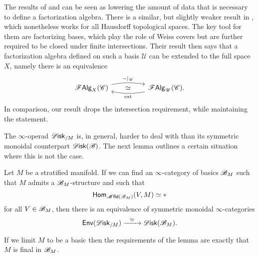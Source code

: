 \documentclass[../text.tex]{subfiles}
\begin{document}
\begin{remark}
    The results of  and  can be seen as lowering the amount of data that is necessary to define a factorization algebra. There is a similar, but slightly weaker result in \cite[\S7.2]{cg2016}, which nonetheless works for all Hausdorff topological spaces. The key tool for them are factorizing bases, which play the role of Weiss covers but are further required to be closed under finite intersections. Their result then says that a factorization algebra defined on such a basis $\mathscr{U}$ can be extended to the full space $X$, namely there is an equivalence
    \begin{equation}
        \begin{tikzcd}
            \falg_X(\catC) \arrow[rr, bend left=10, "\mathrm{-|_{\mathscr{U}}}"] \arrow[rr, phantom, "\simeq"]&  & \falg_{\mathscr{U}}(\catC) \arrow[ll, bend left=10, "\mathrm{ext}"].
        \end{tikzcd}
    \end{equation}
    In comparison, our result drops the intersection requirement, while maintaining the statement.
\end{remark}

The $\infty$-operad $\disk_{/M}$ is, in general, harder to deal with than its symmetric monoidal counterpart $\disk(\bstr)$. The next lemma outlines a certain situation where this is not the case.

\begin{lemma}\label{lem:disk/M_to_disk}
    Let $M$ be a stratified manifold. If we can find an $\infty$-category of basics $\mathscr{B}_M$ such that $M$ admits a $\mathscr{B}_M$-structure and such that
    \begin{equation}
        \mathsf{Hom}_{\mfld(\bstr_M)} (V, M) \simeq *
    \end{equation}
    for all $V \in \mathscr{B}_M$, then there is an equivalence of symmetric monoidal $\infty$-categories
    \begin{equation}
        \mathsf{Env}(\disk_{/M}) \xrightarrow{\ \ \simeq \ \ } \disk(\bstr_M).
    \end{equation}
\end{lemma}

\begin{remark}
    If we limit $M$ to be a basic then the requirements of the lemma are exactly that $M$ is final in $\mathscr{B}_M$.
\end{remark}
\end{document}
